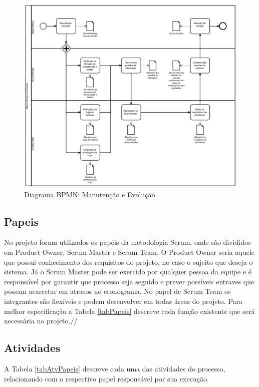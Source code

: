 \documentclass[	DIV=calc,%
							paper=a4,%
							fontsize=12pt,%
							onecolumn]{scrartcl}%
\begin{document}
\begin{figure}
\centering
\includegraphics[width=\textwidth]{manutencao-evolucao.png}
\caption{Diagrama BPMN: Manutenção e Evolução}
\label{manutencao}
\end{figure}
\FloatBarrier




\subsection{Papeis}
No projeto foram utilizados os papéis da metodologia Scrum, onde são divididos em Product Owner, Scrum Master e Scrum Team. O Product Owner seria aquele que possui conhecimento dos requisitos do projeto, no caso o sujeito que deseja o sistema. Já o Scrum Master pode ser exercido por qualquer pessoa da equipe e é responsável por garantir que processo seja seguido e prever possíveis entraves que possam acarretar em atrasos no cronograma. No papel de Scrum Team os integrantes são flexíveis e podem desenvolver em todas áreas do projeto. Para melhor especificação a Tabela \ref{tabPapeis} descreve cada função existente que será necessária no projeto.//



\FloatBarrier


\subsection{Atividades}
A Tabela \ref{tabAtvPapeis} descreve cada uma das atividades do processo, relacionando com o respectivo papel responsável por sua execução. \\
\end{document}
